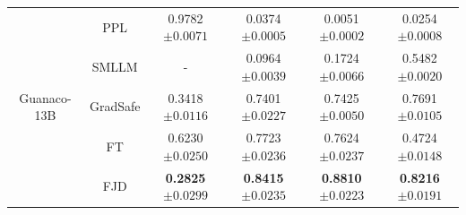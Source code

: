 \documentclass{article}
\begin{document}
\begin{table}[t]
\begin{tabular}{cccccc}
    \midrule
    \multirow{5}{*}{Guanaco-13B} 
    & PPL  & 0.9782\tiny{$\pm 0.0071$} & 0.0374\tiny{$\pm 0.0005$} & 0.0051\tiny{$\pm 0.0002$} & 0.0254\tiny{$\pm 0.0008$} \\
    & SMLLM & - & 0.0964\tiny{$\pm 0.0039$} & 0.1724\tiny{$\pm 0.0066$} & 0.5482\tiny{$\pm 0.0020$} \\
    & GradSafe & 0.3418\tiny{$\pm 0.0116$} & 0.7401\tiny{$\pm 0.0227$} & 0.7425\tiny{$\pm 0.0050$} & 0.7691\tiny{$\pm 0.0105$}  \\
    & FT & 0.6230\tiny{$\pm 0.0250$} & 0.7723\tiny{$\pm 0.0236$} & 0.7624\tiny{$\pm 0.0237$} & 0.4724\tiny{$\pm 0.0148$} \\
    & FJD & \textbf{0.2825}\tiny{$\pm 0.0299$} & \textbf{0.8415}\tiny{$\pm 0.0235$} & \textbf{0.8810}\tiny{$\pm 0.0223$} & \textbf{0.8216}\tiny{$\pm 0.0191$} \\
    
    \bottomrule
  \end{tabular}

\end{table}
\end{document}
